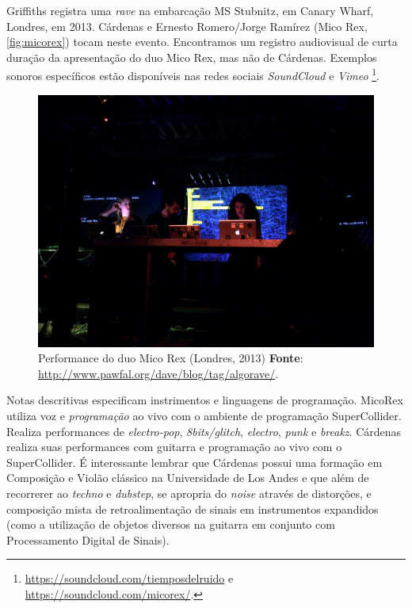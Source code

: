 Griffiths registra uma \emph{rave} na embarcação  MS Stubnitz, em Canary Wharf, Londres, em 2013. Cárdenas e Ernesto Romero/Jorge Ramírez (Mico Rex, \autoref{fig:micorex}) tocam neste evento. Encontramos um registro audiovisual de curta duração da apresentação do duo Mico Rex, mas não de Cárdenas. Exemplos sonoros específicos estão disponíveis nas redes sociais \emph{SoundCloud} e \emph{Vimeo} \footnote{\url{https://soundcloud.com/tiemposdelruido} e \url{https://soundcloud.com/micorex/}.}.

\begin{figure}[!h]
  \centering
  \includegraphics[scale=0.31]{imagens/cardenas.jpg}
  \caption{Performance do duo Mico Rex (Londres, 2013) \textbf{Fonte}: \url{http://www.pawfal.org/dave/blog/tag/algorave/}.}
  \label{fig:cardenas}
\end{figure}

Notas descritivas especificam instrimentos e linguagens de programação. MicoRex utiliza voz e \emph{programação} ao vivo com o ambiente de programação SuperCollider. Realiza performances de \emph{electro-pop}, \emph{8bits/glitch}, \emph{electro}, \emph{punk} e \emph{breakz}. Cárdenas realiza suas performances com guitarra e programação ao vivo com o SuperCollider. É interessante lembrar que Cárdenas possui uma formação em Composição e Violão clássico na Universidade de Los Andes e que além de recorrerer ao \emph{techno} e \emph{dubstep}, se apropria do \emph{noise} através de distorções, e composição mista de retroalimentação de sinais em instrumentos expandidos (como a utilização de objetos diversos na guitarra em conjunto com Processamento Digital de Sinais).

